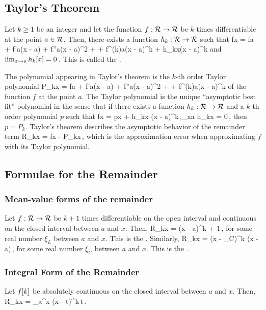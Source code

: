 \subsection{Taylor's Theorem}
Let $k\geq 1$ be an integer and let the function ${f}:{\mathcal{R}}\to{\mathcal{R}}$ be $k$ times differentiable at the point $a\in\mathcal{R}$. Then, there exists a function ${h_k}:{\mathcal{R}}\to{\mathcal{R}}$ such that
\beq
f\vat x = f\vat a 
          + f'\vat a(x - a) 
          +  f''\vat a(x - a)^2
          + \dotsb
          +  f^{(k)}\vat a(x - a)^k
          + h_k\vat x(x - a)^k
\eeq
and $\lim_{x\to a}h_k\!\left[{x}\right] = 0$\,. This is called the .

The polynomial appearing in Taylor's theorem is the $k$-th order Taylor polynomial
\beq
P_k\vat x = f\vat a 
          + f'\vat a(x - a) 
          +  f''\vat a(x - a)^2
          + \dotsb
          +  f^{(k)}\vat a(x - a)^k
\eeq
of the function $f$ at the point $a$. The Taylor polynomial is the unique ``asymptotic best fit'' polynomial in the sense that if there exists a function ${h_k}:{\mathcal{R}}\to{\mathcal{R}}$ and a $k$-th order polynomial $p$ such that
\beq
f\vat x = p\vat x + h_k\vat x (x - a)^k\,,\qquad \lim_{x\to a} h_k\vat x = 0\,,
\eeq
then $p = P_k$. Taylor's theorem describes the asymptotic behavior of the remainder term
\beq
R_k\vat x = f\vat x - P_k\vat x\,,
\eeq
which is the approximation error when approximating $f$ with its Taylor polynomial.


\subsection{Formulae for the Remainder}

\subsubsection{Mean-value forms of the remainder}
Let ${f}:{\mathcal{R}}\to{\mathcal{R}}$ be $k + 1$ times differentiable on the open interval and continuous on the closed interval between $a$ and $x$. Then,
\beq
R_k\vat x = (x - a)^{k + 1}\,,
\eeq
for some real number $\xi_L$ between $a$ and $x$. This is the . Similarly,
\beq
R_k\vat x = (x - \xi_C)^k (x - a)\,,
\eeq
for some real number $\xi_C$ between $a$ and $x$. This is the .


\subsubsection{Integral Form of the Remainder}
Let $f\!\left[{k}\right]$ be absolutely continuous on the closed interval between $a$ and $x$. Then,
\beq
R_k\vat x = \int_{a}^{x} (x - t)^k\,\dx t\,.
\eeq


